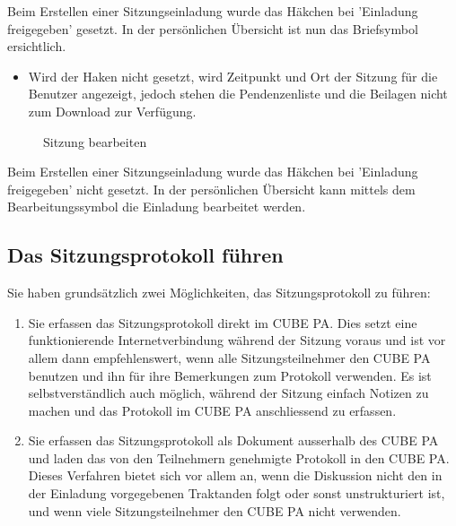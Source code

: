 \begin{small}
Beim Erstellen einer Sitzungseinladung wurde das Häkchen bei 'Einladung freigegeben' gesetzt. In der persönlichen Übersicht ist nun das Briefsymbol ersichtlich.
\end{small}

\begin{itemize}
\item
Wird der Haken nicht gesetzt, wird Zeitpunkt und Ort der Sitzung für die Benutzer angezeigt, jedoch stehen die Pendenzenliste und die Beilagen nicht zum Download zur Verfügung.
\end{itemize}

\begin{figure}[H]
\caption{Sitzung bearbeiten}
\end{figure}

\begin{small}
Beim Erstellen einer Sitzungseinladung wurde das Häkchen bei 'Einladung freigegeben' nicht gesetzt. In der persönlichen Übersicht kann mittels dem Bearbeitungssymbol die Einladung bearbeitet werden.
\end{small}


\subsection{Das Sitzungsprotokoll führen}

Sie haben grundsätzlich zwei Möglichkeiten, das Sitzungsprotokoll zu führen:

\begin{enumerate}
\item
Sie erfassen das Sitzungsprotokoll direkt im CUBE PA. Dies setzt eine funktionierende Internetverbindung während der Sitzung voraus und ist vor allem dann empfehlenswert, wenn alle Sitzungsteilnehmer den CUBE PA benutzen und ihn für ihre Bemerkungen zum Protokoll verwenden. Es ist selbstverständlich auch möglich, während der Sitzung einfach Notizen
zu machen und das Protokoll im CUBE PA anschliessend zu erfassen.
\item
Sie erfassen das Sitzungsprotokoll als Dokument ausserhalb des CUBE PA und laden das von den Teilnehmern genehmigte Protokoll in den CUBE PA. Dieses Verfahren bietet sich vor allem an, wenn die Diskussion nicht den in der Einladung vorgegebenen Traktanden folgt oder sonst unstrukturiert ist, und wenn viele Sitzungsteilnehmer den CUBE PA nicht
verwenden.
\end{enumerate}


